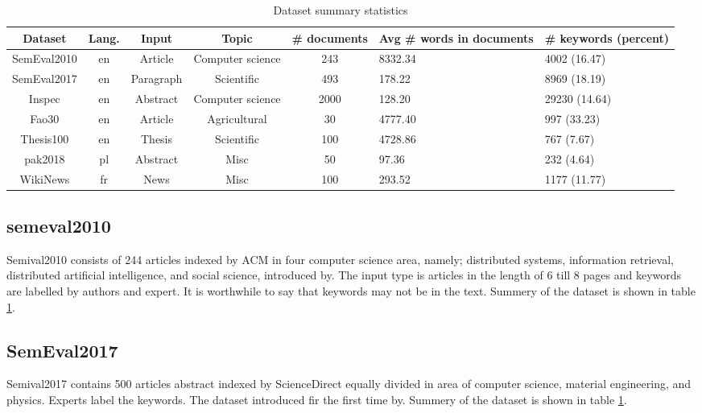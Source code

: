 \documentclass[3p]{elsarticle}
\begin{document}
\begin{table}[]
    \centering
    \caption{Dataset summary statistics}
    \label{tbl:dataset_summary}
    \begin{tabular}{cccccm{2cm}m{2cm}}
        \hline
        \textbf{Dataset}    &\textbf{Lang.}    &\textbf{Input} &\textbf{Topic} &\textbf{\# documents}    &\textbf{Avg \# words in documents}   &\textbf{\# keywords (percent)} \\
        \hline
        SemEval2010 \cite{Kim2013}  &en &Article    &Computer science   &243    &8332.34    &4002 (16.47)   \\
        \rowcolor{gray!10} SemEval2017 \cite{Augenstein2018}    &en &Paragraph  &Scientific &493    &178.22 &8969 (18.19)   \\
        Inspec \cite{Hulth2003} &en &Abstract   &Computer science   &2000   &128.20 &29230 (14.64) \\
        \rowcolor{gray!10} Fao30 \cite{Medelyan2006}    &en &Article    &Agricultural   &30 &4777.40    &997 (33.23)    \\
Thesis100 \cite{medelyan_2015}  &en &Thesis &Scientific &100    &4728.86    &767 (7.67)\\
        \rowcolor{gray!10} pak2018 \cite{Campos2020}    &pl &Abstract   &Misc   &50 &97.36  &232 (4.64)  \\
        WikiNews \cite{Bougouin2013}    &fr &News   &Misc   &100   &293.52   &1177 (11.77)   \\
\hline
    \end{tabular}
\end{table}

\subsection*{semeval2010}
Semival2010 consists of 244 articles indexed by ACM in four computer science area, namely; distributed systems, information retrieval, distributed artificial intelligence, and social science, introduced by\citet{Kim2013}. The input type is articles in the length of 6 till 8 pages and keywords are labelled by authors and expert. It is worthwhile to say that keywords may not be in the text. Summery of the dataset is shown in table \ref{tbl:dataset_summary}.

\subsection*{SemEval2017}
Semival2017 contains 500 articles abstract indexed by ScienceDirect equally divided in area of computer science, material engineering, and physics. Experts label the keywords. The dataset introduced fir the first time by\citet{Augenstein2018}. Summery of the dataset is shown in table \ref{tbl:dataset_summary}.
\end{document}
